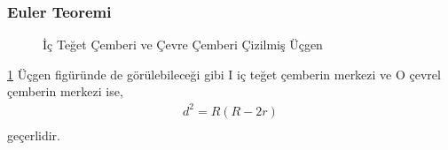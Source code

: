 \subsubsection{Euler Teoremi}
\begin{figure}[h!]
    \centering
    \caption{İç  Teğet Çemberi ve Çevre Çemberi Çizilmiş Üçgen}
    \label{fig:eulertrig}
\end{figure}

\ref{fig:eulertrig} Üçgen figüründe de görülebileceği gibi I iç teğet çemberin merkezi ve O çevrel çemberin merkezi ise,
\begin{equation}
    \begin{aligned}
    d^2 = R(R-2r) \\
    \end{aligned}
\end{equation}
geçerlidir.